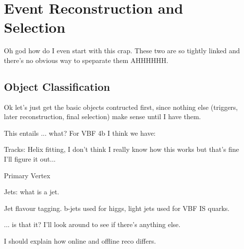 \chapter{Event Reconstruction and Selection}

    Oh god how do I even start with this crap. These two are so tightly linked and there's no obvious way to speparate them AHHHHHH.
    
%


\section{Object Classification}

    Ok let's just get the basic objects contructed first, since nothing else (triggers, later reconstruction, final selection)
        make sense until I have them.

    This entails ... what? For VBF 4b I think we have:

    Tracks: Helix fitting, I don't think I really know how this works but that's fine I'll figure it out...

    Primary Vertex

    Jets:
        what is a jet.

    Jet flavour tagging.
        b-jets used for higgs,
        light jets used for VBF IS quarks.
    
    ... is that it? I'll look around to see if there's anything else.

    I should explain how online and offline reco differs.
    \cite{cell_clustering}
    \cite{bjet_id_and_performance}
    


    





